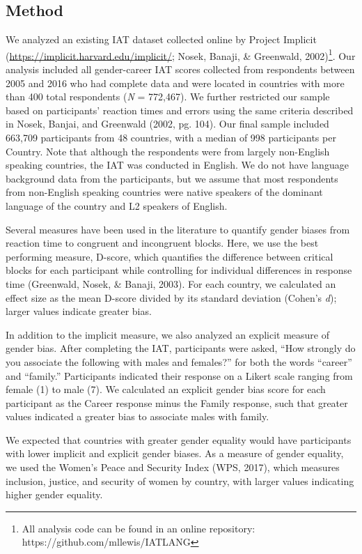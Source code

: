 \documentclass[10pt, letterpaper]{article}
\begin{document}
\subsection{Method}\label{method}

We analyzed an existing IAT dataset collected online by Project Implicit
(\url{https://implicit.harvard.edu/implicit/}; Nosek, Banaji, \&
Greenwald,
2002)\footnote{All analysis code can be found in an online repository: https://github.com/mllewis/IATLANG}.
Our analysis included all gender-career IAT scores collected from
respondents between 2005 and 2016 who had complete data and were located
in countries with more than 400 total respondents (\emph{N} = 772,467).
We further restricted our sample based on participants' reaction times
and errors using the same criteria described in Nosek, Banjai, and
Greenwald (2002, pg. 104). Our final sample included 663,709
participants from 48 countries, with a median of 998 participants per
Country. Note that although the respondents were from largely
non-English speaking countries, the IAT was conducted in English. We do
not have language background data from the participants, but we assume
that most respondents from non-English speaking countries were native
speakers of the dominant language of the country and L2 speakers of
English.

Several measures have been used in the literature to quantify gender
biases from reaction time to congruent and incongruent blocks. Here, we
use the best performing measure, D-score, which quantifies the
difference between critical blocks for each participant while
controlling for individual differences in response time (Greenwald,
Nosek, \& Banaji, 2003). For each country, we calculated an effect size
as the mean D-score divided by its standard deviation (Cohen's
\emph{d}); larger values indicate greater bias.

In addition to the implicit measure, we also analyzed an explicit
measure of gender bias. After completing the IAT, participants were
asked, ``How strongly do you associate the following with males and
females?'' for both the words ``career'' and ``family.'' Participants
indicated their response on a Likert scale ranging from female (1) to
male (7). We calculated an explicit gender bias score for each
participant as the Career response minus the Family response, such that
greater values indicated a greater bias to associate males with family.

We expected that countries with greater gender equality would have
participants with lower implicit and explicit gender biases. As a
measure of gender equality, we used the Women's Peace and Security Index
(WPS, 2017), which measures inclusion, justice, and security of women by
country, with larger values indicating higher gender equality.
\end{document}
